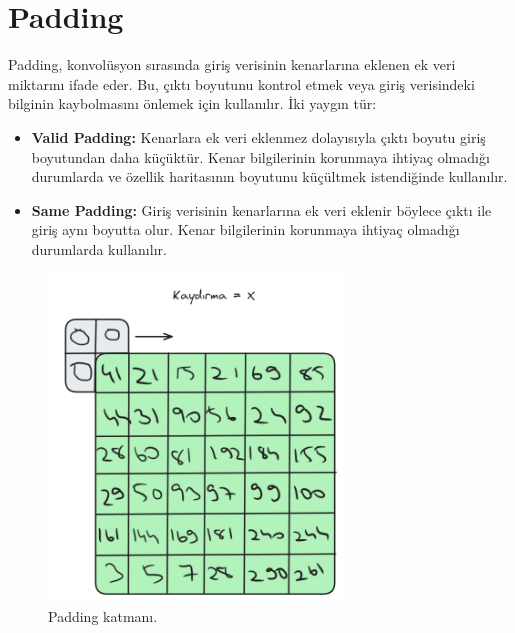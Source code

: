 \section{Padding}
Padding, konvolüsyon sırasında giriş verisinin kenarlarına eklenen ek veri miktarını ifade eder. Bu, çıktı boyutunu kontrol etmek veya giriş verisindeki bilginin kaybolmasını önlemek için kullanılır. İki yaygın tür:

\begin{itemize}
    \item \textbf{Valid Padding:} Kenarlara ek veri eklenmez dolayısıyla çıktı boyutu giriş boyutundan daha küçüktür. Kenar bilgilerinin korunmaya ihtiyaç olmadığı durumlarda ve özellik haritasının boyutunu küçültmek istendiğinde kullanılır.
    \item \textbf{Same Padding:} Giriş verisinin kenarlarına ek veri eklenir böylece çıktı ile giriş aynı boyutta olur. Kenar bilgilerinin korunmaya ihtiyaç olmadığı durumlarda kullanılır.
\end{itemize}

\begin{figure}[h]
    \centering
    \includegraphics[width=0.7\textwidth]{images/padding_layer.png}
    \caption{Padding katmanı.}
    \label{fig:enter-label}
\end{figure}

\newpage